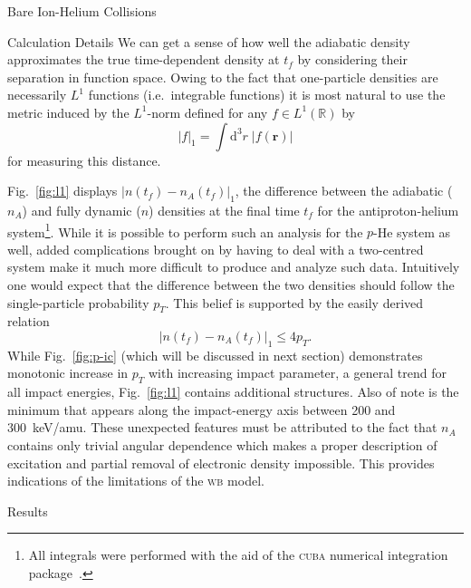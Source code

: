 \documentclass[a5paper, 9 pt]{extreport}
\begin{document}
\begin{chapter}{Bare Ion-Helium Collisions \label{chap:p-he2p-he}}
\begin{section}{Calculation Details \label{sec:phe2p-det}}
      We can get a sense of how well the adiabatic density approximates the true time-dependent density
      at $t_f$ by considering their separation in function space. Owing to the fact that one-particle
      densities are necessarily $L^1$ functions (i.e.\ integrable functions) it is most natural to use
      the metric induced by the $L^1$-norm defined for any
      $f \in L^1\left(\mathbb{R}\right)$ by
      \begin{equation} \label{eq:l1rorm}
         \left| f \right|_1 = \int \mathrm{d}^3 r \; \left| f(\mathbf{r}) \right|
      \end{equation}
      for measuring this distance.

      Fig.~\ref{fig:l1} displays $\left| n(t_f) - n_A(t_f) \right|_1$, the difference between the
      adiabatic ($n_A$) and fully dynamic ($n$) densities at the final time $t_f$ for the
      antiproton-helium system\footnote{All integrals were performed with the aid of the \textsc{cuba}
      numerical integration package~\cite{cuba}.}. While it is possible to perform such an analysis for
      the $p$-He system as well, added complications brought on by having to deal with a two-centred
      system make it much more difficult to produce and analyze such data. Intuitively one would expect
      that the difference between the two densities should follow the single-particle probability $p_T$.
      This belief is supported by the easily derived relation
      \begin{equation} \label{eq:diff-bound}
         \left| n(t_f) - n_A(t_f) \right|_1 \leq 4 p_T.
      \end{equation}
      While Fig.~\ref{fig:p-ic} (which will be discussed in next section) demonstrates monotonic
      increase in $p_T$ with increasing impact parameter, a general trend for all impact energies,
      Fig.~\ref{fig:l1} contains additional structures. Also of note is the minimum that appears along
      the impact-energy axis between 200 and 300~keV/amu. These unexpected features must be attributed
      to the fact that $n_A$ contains only trivial angular dependence which makes a proper description
      of excitation and partial removal of electronic density impossible. This provides indications of
      the limitations of the \textsc{wb} model.

   \end{section}

   \begin{section}{Results \label{sec:phe2p-res}}


\end{section}
\end{chapter}
\end{document}
